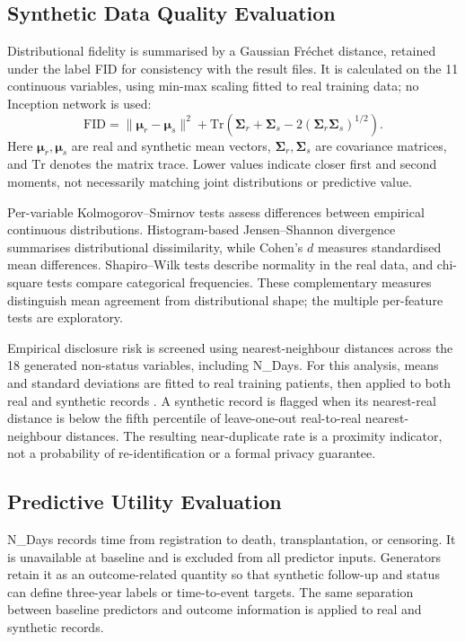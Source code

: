 \documentclass[journal]{IEEEtran}
\begin{document}
\subsection{Synthetic Data Quality Evaluation}

Distributional fidelity is summarised by a Gaussian Fr\'{e}chet distance, retained under the label FID for consistency with the result files. It is calculated on the 11 continuous variables, using min-max scaling fitted to real training data; no Inception network is used:
\begin{equation}
\mathrm{FID}=\|\boldsymbol{\mu}_r-\boldsymbol{\mu}_s\|^2+
\mathrm{Tr}\left(\boldsymbol{\Sigma}_r+\boldsymbol{\Sigma}_s
-2(\boldsymbol{\Sigma}_r\boldsymbol{\Sigma}_s)^{1/2}\right).
\end{equation}
Here $\boldsymbol{\mu}_r,\boldsymbol{\mu}_s$ are real and synthetic mean vectors, $\boldsymbol{\Sigma}_r,\boldsymbol{\Sigma}_s$ are covariance matrices, and $\mathrm{Tr}$ denotes the matrix trace. Lower values indicate closer first and second moments, not necessarily matching joint distributions or predictive value.

Per-variable Kolmogorov--Smirnov tests assess differences between empirical continuous distributions. Histogram-based Jensen--Shannon divergence summarises distributional dissimilarity, while Cohen's $d$ measures standardised mean differences. Shapiro--Wilk tests describe normality in the real data, and chi-square tests compare categorical frequencies. These complementary measures distinguish mean agreement from distributional shape; the multiple per-feature tests are exploratory.

Empirical disclosure risk is screened using nearest-neighbour distances across the 18 generated non-status variables, including N\_Days. For this analysis, means and standard deviations are fitted to real training patients, then applied to both real and synthetic records \cite{pedregosa2011}. A synthetic record is flagged when its nearest-real distance is below the fifth percentile of leave-one-out real-to-real nearest-neighbour distances. The resulting near-duplicate rate is a proximity indicator, not a probability of re-identification or a formal privacy guarantee.

\subsection{Predictive Utility Evaluation}
\label{sec:predutil}

N\_Days records time from registration to death, transplantation, or censoring. It is unavailable at baseline and is excluded from all predictor inputs. Generators retain it as an outcome-related quantity so that synthetic follow-up and status can define three-year labels or time-to-event targets. The same separation between baseline predictors and outcome information is applied to real and synthetic records.
\end{document}
